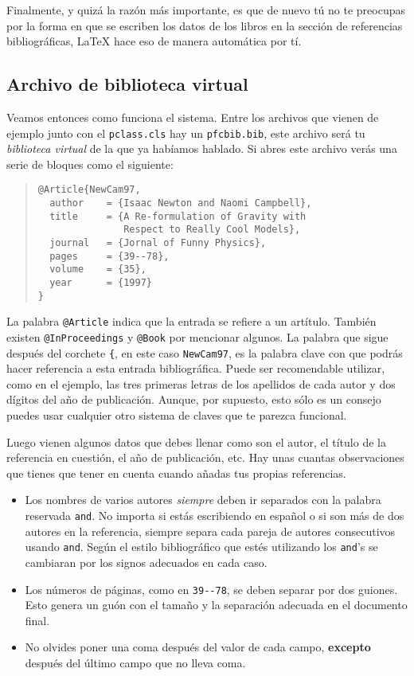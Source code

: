 Finalmente, y quiz\'a la raz\'on m\'as importante, es que de nuevo t\'u no te preocupas por la forma en que se 
escriben los datos de los libros en la secci\'on de referencias bibliogr\'aficas, \LaTeX{} hace eso de manera 
autom\'atica por t\'i.


\subsection{Archivo de biblioteca virtual}

Veamos entonces como funciona el sistema. Entre los archivos que vienen de ejemplo junto con el 
\texttt{pclass.cls} hay un \texttt{pfcbib.bib}, este archivo ser\'a tu \emph{biblioteca virtual} de la que 
ya hab\'iamos hablado. Si abres este archivo ver\'as una serie de bloques como el siguiente:

\begin{quote}
\begin{verbatim}
@Article{NewCam97,
  author    = {Isaac Newton and Naomi Campbell},
  title     = {A Re-formulation of Gravity with
               Respect to Really Cool Models},
  journal   = {Jornal of Funny Physics},
  pages     = {39--78},
  volume    = {35},
  year      = {1997}
}
\end{verbatim}
\end{quote}


La palabra \verb|@Article| indica que la entrada se refiere a un art\'itulo. Tambi\'en
existen \verb|@InProceedings| y \verb|@Book| por mencionar algunos. La palabra que sigue
despu\'es del corchete \verb|{|, en este caso \texttt{NewCam97}, es la palabra clave con que
podr\'as hacer referencia a esta entrada bibliogr\'afica. Puede ser recomendable utilizar, como
en el ejemplo, las tres primeras letras de los apellidos de cada autor y dos
d\'igitos del a\~no de publicaci\'on. Aunque, por supuesto, esto s\'olo es un consejo puedes usar 
cualquier otro sistema de claves que te parezca funcional.

Luego vienen algunos datos que debes llenar como son el autor, el t\'itulo de la
referencia en cuesti\'on, el a\~no de publicaci\'on, etc. Hay unas cuantas observaciones que tienes 
que tener en cuenta cuando a\~nadas tus propias referencias.

\begin{itemize}
\item Los nombres de varios autores \emph{siempre} deben ir separados con la palabra
reservada \texttt{and}. No importa si est\'as escribiendo en espa\~nol o si son m\'as de dos
autores en la referencia, siempre separa cada pareja de autores consecutivos usando
\texttt{and}. Seg\'un el estilo bibliogr\'afico que est\'es utilizando los \texttt{and}'s se
cambiaran por los signos adecuados en cada caso.

\item Los n\'umeros de p\'aginas, como en \verb|39--78|, se deben separar por dos
guiones. Esto genera un gu\'on con el tama\~no y la separaci\'on adecuada en el documento final.

\item No olvides poner una coma despu\'es del valor de cada campo, \textbf{excepto} 
despu\'es del \'ultimo campo que no lleva coma.
\end{itemize}

